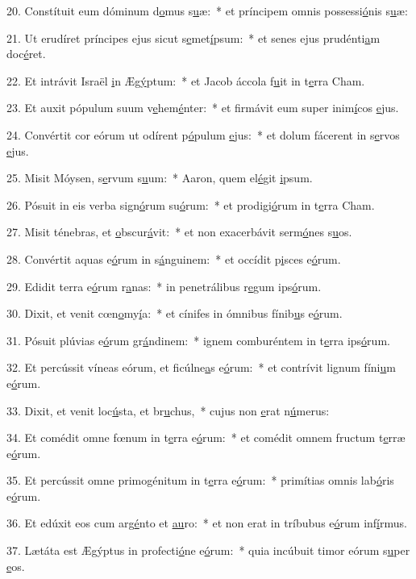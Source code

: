 20. Constítuit eum dóminum d\uline{o}mus s\uline{u}æ:~* et príncipem omnis possessi\uline{ó}nis s\uline{u}æ:\par 
21. Ut erudíret príncipes ejus sicut s\uline{e}met\uline{í}psum:~* et senes ejus prudénti\uline{a}m doc\uline{é}ret.\par 
22. Et intrávit Israël \uline{i}n Æg\uline{ý}ptum:~* et Jacob áccola f\uline{u}it in t\uline{e}rra Cham.\par 
23. Et auxit pópulum suum v\uline{e}hem\uline{é}nter:~* et firmávit eum super inim\uline{í}cos \uline{e}jus.\par 
24. Convértit cor eórum ut odírent p\uline{ó}pulum \uline{e}jus:~* et dolum fácerent in s\uline{e}rvos \uline{e}jus.\par 
25. Misit Móysen, s\uline{e}rvum s\uline{u}um:~* Aaron, quem el\uline{é}git \uline{i}psum.\par 
26. Pósuit in eis verba sign\uline{ó}rum su\uline{ó}rum:~* et prodigi\uline{ó}rum in t\uline{e}rra Cham.\par 
27. Misit ténebras, et \uline{o}bscur\uline{á}vit:~* et non exacerbávit serm\uline{ó}nes s\uline{u}os.\par 
28. Convértit aquas e\uline{ó}rum in s\uline{á}nguinem:~* et occídit p\uline{i}sces e\uline{ó}rum.\par 
29. Edidit terra e\uline{ó}rum r\uline{a}nas:~* in penetrálibus r\uline{e}gum ips\uline{ó}rum.\par 
30. Dixit, et venit cœn\uline{o}my\uline{í}a:~* et cínifes in ómnibus fínib\uline{u}s e\uline{ó}rum.\par 
31. Pósuit plúvias e\uline{ó}rum gr\uline{á}ndinem:~* ignem comburéntem in t\uline{e}rra ips\uline{ó}rum.\par 
32. Et percússit víneas eórum, et ficúlne\uline{a}s e\uline{ó}rum:~* et contrívit lignum fíni\uline{u}m e\uline{ó}rum.\par 
33. Dixit, et venit loc\uline{ú}sta, et br\uline{u}chus,~* cujus non \uline{e}rat n\uline{ú}merus:\par 
34. Et comédit omne fœnum in t\uline{e}rra e\uline{ó}rum:~* et comédit omnem fructum t\uline{e}rræ e\uline{ó}rum.\par 
35. Et percússit omne primogénitum in t\uline{e}rra e\uline{ó}rum:~* primítias omnis lab\uline{ó}ris e\uline{ó}rum.\par 
36. Et edúxit eos cum arg\uline{é}nto et \uline{au}ro:~* et non erat in tríbubus e\uline{ó}rum inf\uline{í}rmus.\par 
37. Lætáta est Ægýptus in profecti\uline{ó}ne e\uline{ó}rum:~* quia incúbuit timor eórum s\uline{u}per \uline{e}os.\par 
